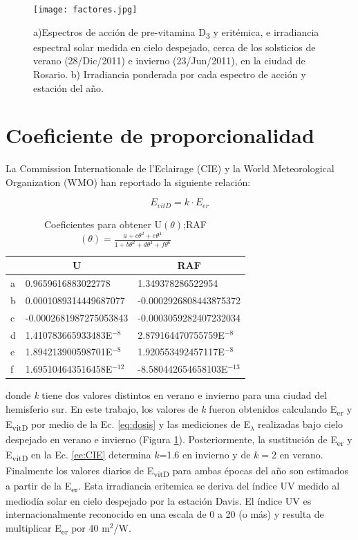 \documentclass[10pt,twocolumn]{article}
\begin{document}
\begin{figure}[ht]
  \centering
  \texttt{[image: factores.jpg]}
  \caption{a)Espectros de acción de pre-vitamina D\textsubscript{3} y eritémica, e irradiancia espectral solar medida en cielo despejado, cerca de los solsticios de verano (28/Dic/2011) e invierno (23/Jun/2011), en la ciudad de Rosario. b) Irradiancia ponderada por cada espectro de acción y estación del año.}
  \label{fig:factores}
\end{figure}

\section{Coeficiente de proporcionalidad}
La Commission Internationale de l’Eclairage (CIE) y la World Meteorological Organization (WMO) han reportado la siguiente relación:

\begin{equation}
  E_{vitD} = k \cdot E_{er}
  \label{ee:CIE}
\end{equation}
\begin{table}[ht]
  \centering
  \caption{Coeficientes\cite{Herman2010} para obtener U$(\theta)$;RAF $(\theta)= \frac{a+c\theta^2+e\theta^4}{1+b\theta^2+d\theta^4+f\theta^6}$}
  \label{table::parametros}
  \begin{tabular}{lll}
    \hline
      & \multicolumn{1}{c}{U}      & \multicolumn{1}{c}{RAF}     \\ \hline
    a & 0.9659616883022778         & 1.349378286522954           \\
    b & 0.0001089314449687077      & -0.0002926808443875372      \\
    c & -0.0002681987275053843     & -0.0003059282407232034      \\
    d & 1.410783665933483E$^{-8 }$ & 2.879164470755759E$^{-8}$   \\
    e & 1.894213900598701E$^{-8 }$ & 1.920553492457117E$^{-8}$   \\
    f & 1.695104643516458E$^{-12}$ & -8.580442654658103E$^{-13}$ \\ \hline
  \end{tabular}
\end{table}

donde \emph{k} tiene dos valores distintos en verano e invierno para una ciudad del hemisferio sur.\cite{UVDoses} En este trabajo, los valores de \emph{k} fueron obtenidos calculando E\textsubscript{er} y E\textsubscript{vitD} por medio de la Ec. \ref{eq:dosis} y las mediciones de E$_\lambda$ realizadas bajo cielo despejado en verano e invierno (Figura \ref{fig:factores}). Posteriormente, la sustitución de E\textsubscript{er} y E\textsubscript{vitD} en la Ec. \ref{ee:CIE} determina $k$=1.6 en invierno y de $k=2$ en verano. Finalmente los valores diarios de E\textsubscript{vitD} para ambas épocas del año son estimados a partir de la E\textsubscript{er}. Esta irradiancia eritemica se deriva del índice UV medido al mediodía solar en cielo despejado por la estación Davis. El índice UV es internacionalmente reconocido en una escala de 0 a 20 (o más) y resulta de multiplicar E\textsubscript{er} por 40 m$^2$/W.
\end{document}
